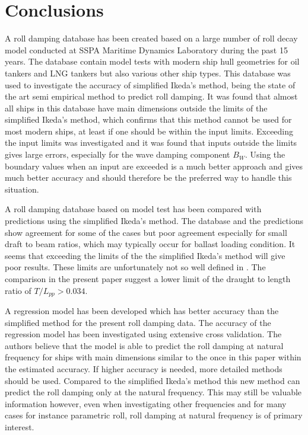 \section{Conclusions}
\label{se:conclusions}
A roll damping database has been created based on a large number of roll decay model conducted at SSPA Maritime Dynamics Laboratory during the past 15 years. The database contain model tests with modern ship hull geometries for oil tankers and LNG tankers but also various other ship types. This database was used to investigate the accuracy of simplified Ikeda's method, being the state of the art semi empirical method to predict roll damping. 
It was found that almost all ships in this database have main dimensions outside the limits of the simplified Ikeda's method, which confirms that this method cannot be used for most modern ships, at least if one should be within the input limits. Exceeding the input limits was investigated and it was found that inputs outside the limits gives large errors, especially for the wave damping component $B_W$. Using the boundary values when an input are exceeded is a much better approach and gives much better accuracy and should therefore be the preferred way to handle this situation.

A roll damping database based on model test has been compared with predictions using  the simplified Ikeda's method. The database and the predictions show agreement for some of the cases but poor agreement especially for small draft to beam ratios, which may typically occur for ballast loading condition. It seems that exceeding the limits of the the simplified Ikeda's method will give poor results. These limits are unfortunately not so well defined in \parencite{kawahara_simple_2011}. The comparison in the present paper suggest a lower limit of the draught to length ratio of $T/L_{pp}>0.034$.

A regression model has been developed which has better accuracy than the simplified method for the present roll damping data. The accuracy of the regression model has been investigated using extensive cross validation. The authors believe that the model is able to predict the roll damping at natural frequency for ships with main dimensions similar to the once in this paper within the estimated accuracy. If higher accuracy is needed, more detailed methods should be used. Compared to the simplified Ikeda's method this new method can predict the roll damping only at the natural frequency. This may still be valuable information however, even when investigating other frequencies and for many cases for instance parametric roll, roll damping at natural frequency is of primary interest.


